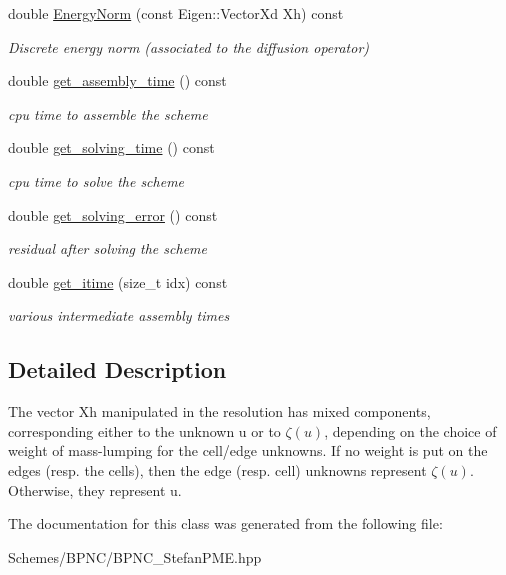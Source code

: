 \begin{DoxyCompactItemize}
double \hyperlink{group__BPNC_ga494151015dbd833a691e50f78966c82d}{Energy\+Norm} (const Eigen\+::\+Vector\+Xd Xh) const
\begin{DoxyCompactList}\small\item\em Discrete energy norm (associated to the diffusion operator) \end{DoxyCompactList}\item 
double \hyperlink{group__BPNC_gade729cb0357bb3f3476c2335a37b822d}{get\+\_\+assembly\+\_\+time} () const
\begin{DoxyCompactList}\small\item\em cpu time to assemble the scheme \end{DoxyCompactList}\item 
double \hyperlink{group__BPNC_ga90122c6a87891a16e7bc19edcfde175c}{get\+\_\+solving\+\_\+time} () const
\begin{DoxyCompactList}\small\item\em cpu time to solve the scheme \end{DoxyCompactList}\item 
double \hyperlink{group__BPNC_gabb15277c1c88313e9e8e18186fea2b2f}{get\+\_\+solving\+\_\+error} () const
\begin{DoxyCompactList}\small\item\em residual after solving the scheme \end{DoxyCompactList}\item 
double \hyperlink{group__BPNC_ga1cdc2dc9af6aa57d315e6660453641f7}{get\+\_\+itime} (size\+\_\+t idx) const
\begin{DoxyCompactList}\small\item\em various intermediate assembly times \end{DoxyCompactList}\end{DoxyCompactItemize}


\subsection{Detailed Description}
The vector Xh manipulated in the resolution has mixed components, corresponding either to the unknown u or to $\zeta(u)$, depending on the choice of weight of mass-\/lumping for the cell/edge unknowns. If no weight is put on the edges (resp. the cells), then the edge (resp. cell) unknowns represent $\zeta(u)$. Otherwise, they represent u. 

The documentation for this class was generated from the following file\+:\begin{DoxyCompactItemize}
\item 
Schemes/\+B\+P\+N\+C/B\+P\+N\+C\+\_\+\+Stefan\+P\+M\+E.\+hpp\end{DoxyCompactItemize}
